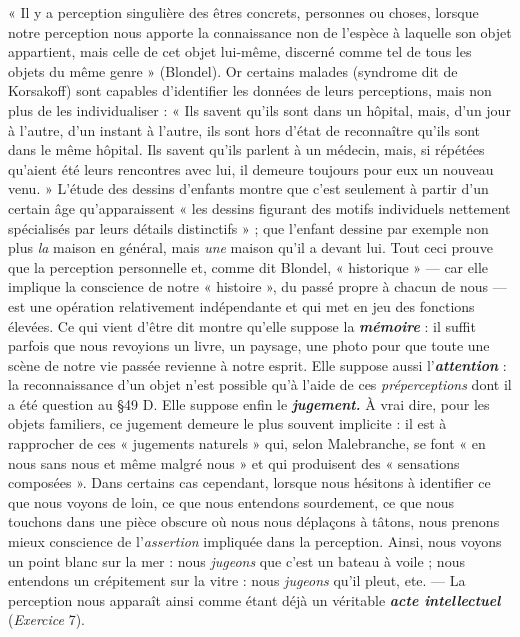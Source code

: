 « Il y a perception singulière des êtres concrets, personnes ou choses,
lorsque notre perception nous apporte la connaissance non de l'espèce
à laquelle son objet appartient, mais celle de cet objet lui-même, discerné
comme tel de tous les objets du même genre » (Blondel). Or
certains malades (syndrome dit de Korsakoff) sont capables d’identifier
les données de leurs perceptions, mais non plus de les individualiser :
« Ils savent qu’ils sont dans un hôpital, mais, d’un jour à
l’autre, d’un instant à l’autre, ils sont hors d’état de reconnaître
qu’ils sont dans le même hôpital. Ils savent qu’ils parlent à un
médecin, mais, si répétées qu’aient été leurs rencontres avec lui, il
demeure toujours pour eux un nouveau venu. » L'étude des dessins
d’enfants montre que c’est seulement à partir d’un certain âge qu’apparaissent
« les dessins figurant des motifs individuels nettement spécialisés
par leurs détails distinctifs » ; que l’enfant dessine par exemple
non plus {\it la} maison en général, mais {\it une} maison qu'il a devant lui.
Tout ceci prouve que la perception personnelle et, comme dit Blondel,
« historique » — car elle implique la conscience de notre « histoire »,
du passé propre à chacun de nous — est une opération relativement
indépendante et qui met en jeu des fonctions élevées. Ce qui vient
d’être dit montre qu’elle suppose la \textbf{\textit {mémoire}} : il suffit parfois que
nous revoyions un livre, un paysage, une photo pour que toute une
scène de notre vie passée revienne à notre esprit. Elle suppose aussi
l'\textbf{\textit {attention}} : la reconnaissance d’un objet n’est possible qu’à l’aide
de ces {\it préperceptions} dont il a été question au \S 49 D. Elle suppose
enfin le \textbf{\textit {jugement.}} À vrai dire, pour les objets familiers, ce jugement
demeure le plus souvent implicite : il est à rapprocher de ces « jugements
naturels » qui, selon Malebranche, se font « en nous sans nous
et même malgré nous » et qui produisent des « sensations composées ».
Dans certains cas cependant, lorsque nous hésitons à identifier ce
que nous voyons de loin, ce que nous entendons sourdement, ce que
nous touchons dans une pièce obscure où nous nous déplaçons à
tâtons, nous prenons mieux conscience de l’{\it assertion} impliquée dans
la perception. Ainsi, nous voyons un point blanc sur la mer : nous
{\it jugeons} que c’est un bateau à voile ; nous entendons un crépitement
sur la vitre : nous {\it jugeons} qu’il pleut, ete. — La perception nous
apparaît ainsi comme étant déjà un véritable \textbf{\textit {acte intellectuel}}
({\it Exercice} 7).

